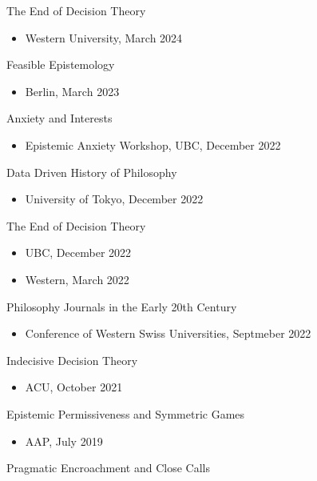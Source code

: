 \documentclass[
  10pt,
  letterpaper,
  DIV=11,
  numbers=noendperiod,
  twoside]{scrartcl}
\providecommand{\tightlist}{%
  \setlength{\itemsep}{0pt}\setlength{\parskip}{0pt}}
\begin{document}
The End of Decision Theory

\begin{itemize}
\tightlist
\item
  Western University, March 2024
\end{itemize}

Feasible Epistemology

\begin{itemize}
\tightlist
\item
  Berlin, March 2023
\end{itemize}

Anxiety and Interests

\begin{itemize}
\tightlist
\item
  Epistemic Anxiety Workshop, UBC, December 2022
\end{itemize}

Data Driven History of Philosophy

\begin{itemize}
\tightlist
\item
  University of Tokyo, December 2022
\end{itemize}

The End of Decision Theory

\begin{itemize}
\tightlist
\item
  UBC, December 2022
\item
  Western, March 2022
\end{itemize}

Philosophy Journals in the Early 20th Century

\begin{itemize}
\tightlist
\item
  Conference of Western Swiss Universities, Septmeber 2022
\end{itemize}

Indecisive Decision Theory

\begin{itemize}
\tightlist
\item
  ACU, October 2021
\end{itemize}

Epistemic Permissiveness and Symmetric Games

\begin{itemize}
\tightlist
\item
  AAP, July 2019
\end{itemize}

Pragmatic Encroachment and Close Calls
\end{document}
